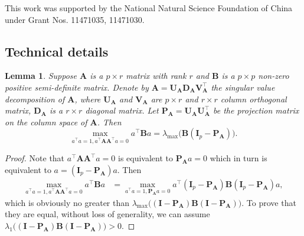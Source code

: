\documentclass[12pt]{article} %
\newcommand{\bA}{\mathbf{A}}
\newcommand{\bB}{\mathbf{B}}
\newcommand{\bP}{\mathbf{P}}
\newcommand{\bI}{\mathbf{I}}
\newcommand{\bU}{\mathbf{U}}
\newcommand{\bD}{\mathbf{D}}
\newcommand{\bV}{\mathbf{V}}
\newtheorem{lemma}{Lemma}
\theoremstyle{definition}
\begin{document}
%
\vskip 14pt
This work was supported by the National Natural Science Foundation of
China under Grant Nos. 11471035, 11471030.
\par




\begin{appendices}
    \section{Technical details}\label{app}
\begin{lemma}\label{optProp}
    Suppose $\bA$ is a $p\times r$ matrix with rank $r$ and $\bB$ is a $p\times p$  non-zero positive semi-definite matrix.
    Denote by $\bA=\bU_\bA \bD_\bA \bV_\bA^\top$ the singular value decomposition of $\bA$, where $\bU_\bA$ and $\bV_\bA$ are $p\times r$ and $r\times r$ column orthogonal matrix, $\bD_\bA$ is a $r\times r$ diagonal matrix.
    Let $\bP_\bA=\bU_\bA \bU_\bA^\top$ be the projection matrix on the column space of $\bA$.
    Then
    \begin{equation}
        \max_{a^\top a=1, a^\top \bA \bA^\top a=0}a^\top \bB a=
        \lambda_{\max}\big(\bB(\bI_p-\bP_\bA)\big).
    \end{equation}
\end{lemma}
\begin{proof}
    Note that $a^\top \bA \bA^\top a=0$ is equivalent to $\bP_\bA a=0$ which in turn is equivalent to $a= (\bI_p-\bP_\bA)a$.
    Then
    \begin{equation}\label{eq:prop1eq1}
        \begin{aligned}
        \max_{a^\top a=1, a^\top \bA \bA^\top a=0}a^\top \bB a
            &=
        \max_{a^\top a=1, \bP_\bA a=0}a^\top(\bI_p-\bP_\bA) \bB (\bI_p-\bP_\bA)a,
        \end{aligned}
    \end{equation}
    which is obviously no greater than $\lambda_{\max}\big((\bI-\bP_\bA)\bB(\bI-\bP_\bA)\big)$.
    To prove that they are equal,  without loss of generality, we can assume $\lambda_{1}\big((\bI-\bP_\bA)\bB(\bI-\bP_\bA)\big)>0$.

\end{proof}
\end{appendices}
\end{document}
